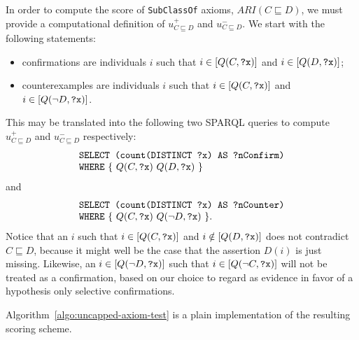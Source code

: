\documentclass{sig-alternate}
\begin{document}
In order to compute the score of \texttt{SubClassOf} axioms, $ARI(C \sqsubseteq D)$, we must provide a computational definition of $u^+_{C \sqsubseteq D}$ and $u^-_{C \sqsubseteq D}$. We start with the following statements:
\begin{itemize}
\item confirmations are individuals $i$ such that
  $i \in [Q(C, \mbox{\tt ?x})]$ and $i \in [Q(D, \mbox{\tt ?x})]$;
\item counterexamples are individuals $i$ such that
  $i \in [Q(C, \mbox{\tt ?x})]$ and $i \in [Q(\neg D, \mbox{\tt ?x})]$.
\end{itemize}
This may be translated into the following two SPARQL queries to compute $u^+_{C \sqsubseteq D}$ and $u^-_{C \sqsubseteq D}$ respectively:
\begin{equation}\label{eq:query-conf}
  \begin{minipage}[c]{5in}
    \begin{tabbing}
      \quad\=\quad\=\quad\=\kill
      \texttt{SELECT (count(DISTINCT ?x) AS ?nConfirm)}\\
      \texttt{WHERE} \{ $Q(C, \mbox{\tt ?x})$ $Q(D, \mbox{\tt ?x})$ \}
    \end{tabbing}
  \end{minipage}
\end{equation}
and
\begin{equation}\label{eq:query-expt}
  \begin{minipage}[c]{5in}
    \begin{tabbing}
      \quad\=\quad\=\quad\=\kill
      \texttt{SELECT (count(DISTINCT ?x) AS ?nCounter)}\\
      \texttt{WHERE} \{ $Q(C, \mbox{\tt ?x})$ $Q(\neg D, \mbox{\tt ?x})$ \}.
    \end{tabbing}
  \end{minipage}
\end{equation}
Notice that an $i$ such that $i \in [Q(C, \mbox{\tt ?x})]$ and $i \notin [Q(D, \mbox{\tt ?x})]$
does not contradict $C \sqsubseteq D$, because it might well be the case
that the assertion $D(i)$ is just missing.
Likewise, an $i \in [Q(\neg D, \mbox{\tt ?x})]$ such that $i \in [Q(\neg C, \mbox{\tt ?x})]$
will not be treated as a confirmation, based on our choice to regard as
evidence in favor of a hypothesis only selective confirmations.

Algorithm~\ref{algo:uncapped-axiom-test} is a plain implementation
of the resulting scoring scheme.
\end{document}
